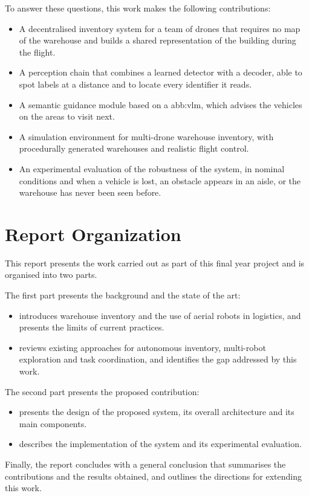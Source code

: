 To answer these questions, this work makes the following contributions:

\begin{itemize}[itemsep=0.4em]
    \item A decentralised inventory system for a team of drones that requires no
          map of the warehouse and builds a shared representation of the building
          during the flight.
    \item A perception chain that combines a learned detector with a
           decoder, able to spot labels at a distance and to
          locate every identifier it reads.
    \item A semantic guidance module based on a \gls{abb:vlm}, which advises the
          vehicles on the areas to visit next.
    \item A simulation environment for multi-drone warehouse inventory, with
          procedurally generated warehouses and realistic flight control.
    \item An experimental evaluation of the robustness of the system, in nominal
          conditions and when a vehicle is lost, an obstacle appears in an aisle,
          or the warehouse has never been seen before.
\end{itemize}

\section*{Report Organization}

This report presents the work carried out as part of this final year project and
is organised into two parts.

The first part presents the background and the state of the art:

\begin{itemize}[itemsep=0.4em]
    \item \textbf{} introduces warehouse inventory and the
          use of aerial robots in logistics, and presents the limits of current
          practices.
    \item \textbf{} reviews existing approaches for autonomous
          inventory, multi-robot exploration and task coordination, and identifies
          the gap addressed by this work.
\end{itemize}

The second part presents the proposed contribution:

\begin{itemize}[itemsep=0.4em]
    \item \textbf{} presents the design of the proposed system,
          its overall architecture and its main components.
    \item \textbf{} describes the implementation of the
          system and its experimental evaluation.
\end{itemize}

Finally, the report concludes with a general conclusion that summarises the
contributions and the results obtained, and outlines the directions for extending
this work.
